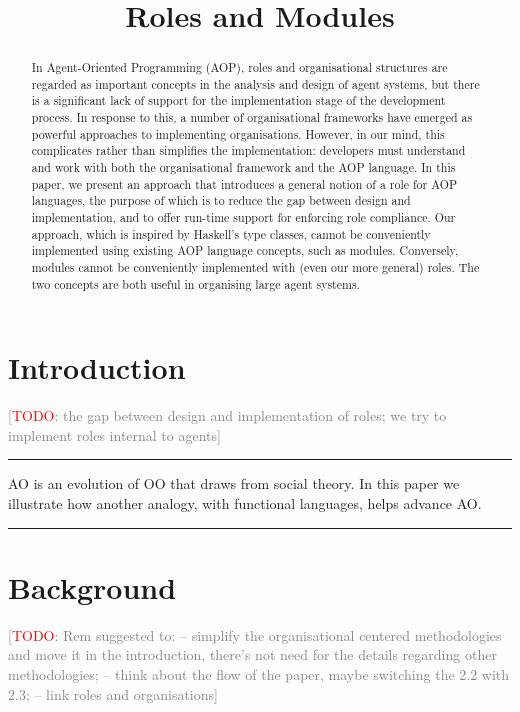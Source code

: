 \documentclass[conference,compsoc]{IEEEtran} %
\title{Roles and Modules}
\author{
  \IEEEauthorblockN{Rem Collier and Claudia Grigore} 
  \IEEEauthorblockA{
    School of Computer Science and Informatics\\
    University College Dublin\\
    Belfield Campus, Dublin~4, Ireland\\
    Email: rem.collier@ucd.ie, claudia.grigore@ucdconnect.ie}}
\newcommand{\todo}[1]{{\small \textcolor{gray}{[\textcolor{red}{TODO}: #1]}}}
\newenvironment{notes}{\medskip\hrule\nobreak\smallskip\narrower}{\smallskip\hrule\medskip}
\begin{document}
\maketitle

\begin{abstract} %

In Agent-Oriented Programming (AOP), roles and organisational structures
are regarded as important concepts in the analysis and design of agent
systems, but there is a significant lack of support for the implementation
stage of the development process. In response to this, a number of
organisational frameworks have emerged as powerful approaches to
implementing organisations. However, in our mind, this complicates rather
than simplifies the implementation: developers must understand and work
with both the organisational framework and the AOP language. In this paper,
we present an approach that introduces a general notion of a role for AOP
languages, the purpose of which is to reduce the gap between design and
implementation, and to offer run-time support for enforcing role
compliance. Our approach, which is inspired by Haskell's type classes,
cannot be conveniently implemented using existing AOP language concepts,
such as modules. Conversely, modules cannot be conveniently implemented
with (even our more general) roles. The two concepts are both useful in
organising large agent systems.  

\end{abstract} %

\section{Introduction} %

\todo{the gap between design and implementation of roles; we try to implement roles internal to agents}

\begin{notes}
AO is an evolution of OO that draws from social theory. In this paper we
illustrate how another analogy, with functional languages, helps advance 
AO\null. 
\end{notes}

\section{Background} %

\todo{Rem suggested to: -- simplify the organisational centered methodologies and move it in the introduction, there's not need for the details regarding other methodologies; -- think about the flow of the paper, maybe switching the 2.2 with 2.3; -- link roles and organisations}
\end{document}
